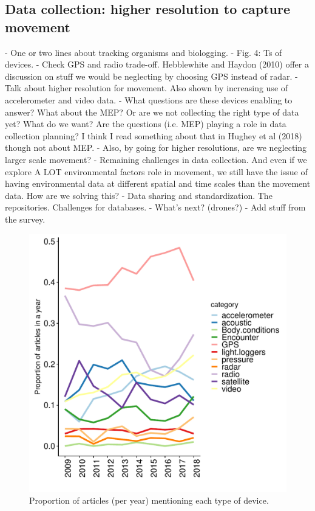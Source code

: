 \documentclass[9pt,twocolumn,twoside,lineno]{pnas-new}
\begin{document}
\subsection*{Data collection: higher resolution to capture movement}

- One or two lines about tracking organisms and biologging. 
- Fig. 4: Ts of devices. 
- Check GPS and radio   trade-off. Hebblewhite and Haydon (2010) offer a discussion on stuff we would be neglecting by choosing GPS instead of radar. 
- Talk about higher resolution for movement. Also shown by increasing use of accelerometer and video data. 
- What questions are these devices enabling to answer? What about the MEP? Or are we not collecting the right type of data yet? What do we want? Are the questions (i.e. MEP) playing a role in data collection planning? I think I read something about that in Hughey et al (2018) though not about MEP. 
- Also, by going for higher resolutions, are we neglecting larger scale movement?
- Remaining challenges in data collection. And even if we explore A LOT environmental factors role in movement, we still have the issue of having environmental data at different spatial and time scales than the movement data. How are we solving this?
- Data sharing and standardization. The repositories. Challenges for databases.
- What's next? (drones?) 
- Add stuff from the survey.

\begin{figure}%
\centering
\includegraphics[width=.8\linewidth]{./img/devices_ts.pdf}
\caption{Proportion of articles (per year) mentioning each type of device.}
\label{fig:devices}
\end{figure}
\end{document}
